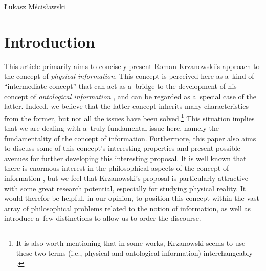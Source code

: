\begin{artengenv}{Łukasz Mścisławski}
\section{Introduction}
This article primarily aims to concisely present Roman Krzanowski's approach to the concept of \textit{physical information.} This concept is perceived here as a~kind of ``intermediate concept'' that can act as a~bridge to the development of his concept of \textit{ontological information}
\parencites[cf.][]{krzanowski_does_2020}[][]{krzanowski_what_2020}[][]{krzanowski_why_2020}[and especially][]{krzanowski_ontological_2022},%
and can be regarded as a~special case of the latter. Indeed, we believe that the latter concept inherits many characteristics from the former, but not all the issues have been solved.\footnote{It is also worth mentioning that in some works, Krzanowski seems to use these two terms (i.e., physical and ontological information) interchangeably
\parencite[cf.][]{krzanowski_what_2020}.%
} This situation implies that we are dealing with a~truly fundamental issue here, namely the fundamentality of the concept of information. Furthermore, this paper also aims to discuss some of this concept's interesting properties and present possible avenues for further developing this interesting proposal. It is well known that there is enormous interest in the philosophical aspects of the concept of information 
\parencites[e.g.,][]{adriaans_philosophy_2008}[][]{burgin_theory_2010}[][]{floridi_philosophy_2011}[][]{dodig_crnkovic_philosophy_2019}, %
 but we feel that Krzanowski's proposal is particularly attractive with some great research potential, especially for studying physical reality. It would %
therefor be helpful, in our opinion, to position this concept within the vast array of philosophical problems related to the notion of information, as well as introduce a~few distinctions to allow us to order the discourse.


\end{artengenv}
